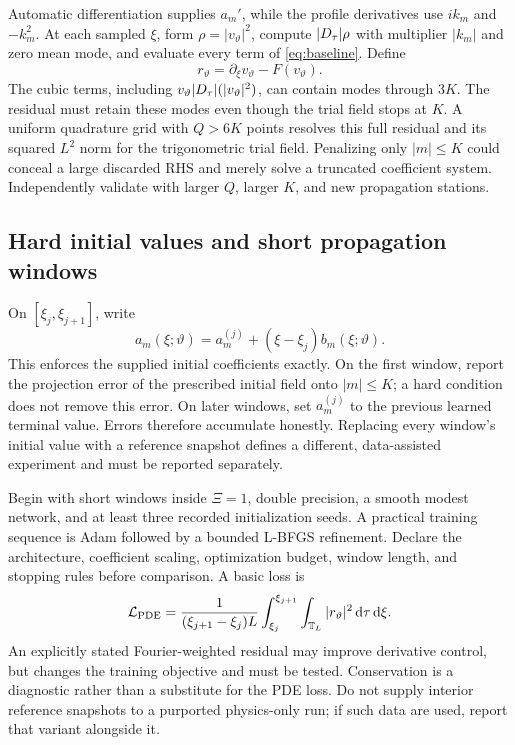 Automatic differentiation supplies $a_m'$, while the profile derivatives
use $ik_m$ and $-k_m^2$.  At each sampled $\xi$, form
$\rho=|v_\vartheta|^2$, compute $\lvert D_\tau\rvert\rho$ with multiplier $|k_m|$ and zero
mean mode, and evaluate every term of \eqref{eq:baseline}.  Define
\begin{equation}\label{eq:pinn-residual}
 r_\vartheta=\partial_\xi v_\vartheta-F(v_\vartheta).
\end{equation}
The cubic terms, including $v_\vartheta\lvert D_\tau\rvert(|v_\vartheta|^2)$, can contain modes
through $3K$.  The residual must retain these modes even though the trial
field stops at $K$.  A uniform quadrature grid with $Q>6K$ points resolves
this full residual and its squared $L^2$ norm for the trigonometric trial
field.  Penalizing only $|m|\leq K$ could conceal a large discarded RHS and
merely solve a truncated coefficient system.  Independently validate with
larger $Q$, larger $K$, and new propagation stations.

\subsection{Hard initial values and short propagation windows}

On $[\xi_j,\xi_{j+1}]$, write
\[
 a_m(\xi;\vartheta)
 =a_m^{(j)}+(\xi-\xi_j)b_m(\xi;\vartheta).
\]
This enforces the supplied initial coefficients exactly.  On the first
window, report the projection error of the prescribed initial field onto
$|m|\leq K$; a hard condition does not remove this error.  On later windows,
set $a_m^{(j)}$ to the previous learned terminal value.  Errors therefore
accumulate honestly.  Replacing every window's initial value with a
reference snapshot defines a different, data-assisted experiment and must
be reported separately.

Begin with short windows inside $\Xi=1$, double precision, a smooth modest
network, and at least three recorded initialization seeds.  A practical
training sequence is Adam followed by a bounded L-BFGS refinement.  Declare
the architecture, coefficient scaling, optimization budget, window length,
and stopping rules before comparison.  A basic loss is
\[
 \mathcal L_{\rm PDE}
 =\frac{1}{(\xi_{j+1}-\xi_j)L}
   \int_{\xi_j}^{\xi_{j+1}}\int_{\mathbb T_L}|r_\vartheta|^2\,\mathrm d\tau\,\mathrm d\xi.
\]
An explicitly stated Fourier-weighted residual may improve derivative
control, but changes the training objective and must be tested.  Conservation
is a diagnostic rather than a substitute for the PDE loss.  Do not supply
interior reference snapshots to a purported physics-only run; if such data
are used, report that variant alongside it.

